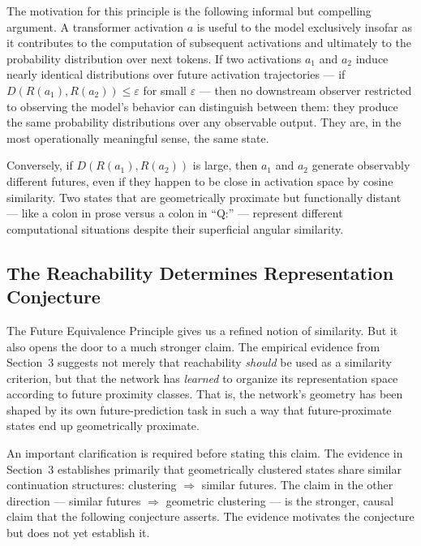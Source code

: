 \documentclass[12pt, a4paper]{article}
\theoremstyle{plain}
\theoremstyle{definition}
\theoremstyle{remark}
\newcommand{\reachset}[1]{R(#1)}
\begin{document}
The motivation for this principle is the following informal but compelling
argument. A transformer activation $a$ is useful to the model exclusively
insofar as it contributes to the computation of subsequent activations and
ultimately to the probability distribution over next tokens. If two activations
$a_1$ and $a_2$ induce nearly identical distributions over future activation
trajectories --- if $D(\reachset{a_1}, \reachset{a_2}) \leq \varepsilon$ for
small $\varepsilon$ --- then no downstream observer restricted to observing the
model's behavior can distinguish between them: they produce the same
probability distributions over any observable output. They are, in the most
operationally meaningful sense, the same state.

Conversely, if $D(\reachset{a_1}, \reachset{a_2})$ is large, then $a_1$ and
$a_2$ generate observably different futures, even if they happen to be close
in activation space by cosine similarity. Two states that are geometrically
proximate but functionally distant --- like a colon in prose versus a colon in
``Q:'' --- represent different computational situations despite their
superficial angular similarity.

\subsection{The Reachability Determines Representation Conjecture}

The Future Equivalence Principle gives us a refined notion of similarity. But
it also opens the door to a much stronger claim. The empirical evidence from
Section~3 suggests not merely that reachability \emph{should} be used as a
similarity criterion, but that the network has \emph{learned} to organize its
representation space according to future proximity classes. That is, the
network's geometry has been shaped by its own future-prediction task in such
a way that future-proximate states end up geometrically proximate.

An important clarification is required before stating this claim. The evidence
in Section~3 establishes primarily that geometrically clustered states share
similar continuation structures: clustering $\Rightarrow$ similar futures.
The claim in the other direction --- similar futures $\Rightarrow$ geometric
clustering --- is the stronger, causal claim that the following conjecture
asserts. The evidence motivates the conjecture but does not yet establish it.
\end{document}
